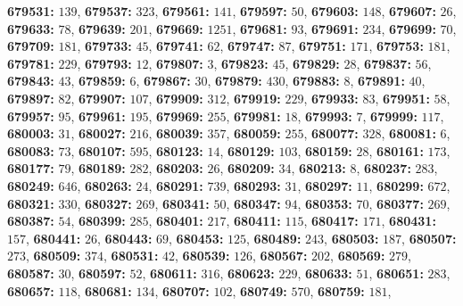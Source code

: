 \textsf{\bfseries 679531:} $139$, \textsf{\bfseries 679537:} $323$, \textsf{\bfseries 679561:} $141$, \textsf{\bfseries 679597:} $50$, \textsf{\bfseries 679603:} $148$, \textsf{\bfseries 679607:} $26$, \textsf{\bfseries 679633:} $78$, \textsf{\bfseries 679639:} $201$, \textsf{\bfseries 679669:} $1251$, \textsf{\bfseries 679681:} $93$, \textsf{\bfseries 679691:} $234$, \textsf{\bfseries 679699:} $70$, \textsf{\bfseries 679709:} $181$, \textsf{\bfseries 679733:} $45$, \textsf{\bfseries 679741:} $62$, \textsf{\bfseries 679747:} $87$, \textsf{\bfseries 679751:} $171$, \textsf{\bfseries 679753:} $181$, \textsf{\bfseries 679781:} $229$, \textsf{\bfseries 679793:} $12$, \textsf{\bfseries 679807:} $3$, \textsf{\bfseries 679823:} $45$, \textsf{\bfseries 679829:} $28$, \textsf{\bfseries 679837:} $56$, \textsf{\bfseries 679843:} $43$, \textsf{\bfseries 679859:} $6$, \textsf{\bfseries 679867:} $30$, \textsf{\bfseries 679879:} $430$, \textsf{\bfseries 679883:} $8$, \textsf{\bfseries 679891:} $40$, \textsf{\bfseries 679897:} $82$, \textsf{\bfseries 679907:} $107$, \textsf{\bfseries 679909:} $312$, \textsf{\bfseries 679919:} $229$, \textsf{\bfseries 679933:} $83$, \textsf{\bfseries 679951:} $58$, \textsf{\bfseries 679957:} $95$, \textsf{\bfseries 679961:} $195$, \textsf{\bfseries 679969:} $255$, \textsf{\bfseries 679981:} $18$, \textsf{\bfseries 679993:} $7$, \textsf{\bfseries 679999:} $117$, \textsf{\bfseries 680003:} $31$, \textsf{\bfseries 680027:} $216$, \textsf{\bfseries 680039:} $357$, \textsf{\bfseries 680059:} $255$, \textsf{\bfseries 680077:} $328$, \textsf{\bfseries 680081:} $6$, \textsf{\bfseries 680083:} $73$, \textsf{\bfseries 680107:} $595$, \textsf{\bfseries 680123:} $14$, \textsf{\bfseries 680129:} $103$, \textsf{\bfseries 680159:} $28$, \textsf{\bfseries 680161:} $173$, \textsf{\bfseries 680177:} $79$, \textsf{\bfseries 680189:} $282$, \textsf{\bfseries 680203:} $26$, \textsf{\bfseries 680209:} $34$, \textsf{\bfseries 680213:} $8$, \textsf{\bfseries 680237:} $283$, \textsf{\bfseries 680249:} $646$, \textsf{\bfseries 680263:} $24$, \textsf{\bfseries 680291:} $739$, \textsf{\bfseries 680293:} $31$, \textsf{\bfseries 680297:} $11$, \textsf{\bfseries 680299:} $672$, \textsf{\bfseries 680321:} $330$, \textsf{\bfseries 680327:} $269$, \textsf{\bfseries 680341:} $50$, \textsf{\bfseries 680347:} $94$, \textsf{\bfseries 680353:} $70$, \textsf{\bfseries 680377:} $269$, \textsf{\bfseries 680387:} $54$, \textsf{\bfseries 680399:} $285$, \textsf{\bfseries 680401:} $217$, \textsf{\bfseries 680411:} $115$, \textsf{\bfseries 680417:} $171$, \textsf{\bfseries 680431:} $157$, \textsf{\bfseries 680441:} $26$, \textsf{\bfseries 680443:} $69$, \textsf{\bfseries 680453:} $125$, \textsf{\bfseries 680489:} $243$, \textsf{\bfseries 680503:} $187$, \textsf{\bfseries 680507:} $273$, \textsf{\bfseries 680509:} $374$, \textsf{\bfseries 680531:} $42$, \textsf{\bfseries 680539:} $126$, \textsf{\bfseries 680567:} $202$, \textsf{\bfseries 680569:} $279$, \textsf{\bfseries 680587:} $30$, \textsf{\bfseries 680597:} $52$, \textsf{\bfseries 680611:} $316$, \textsf{\bfseries 680623:} $229$, \textsf{\bfseries 680633:} $51$, \textsf{\bfseries 680651:} $283$, \textsf{\bfseries 680657:} $118$, \textsf{\bfseries 680681:} $134$, \textsf{\bfseries 680707:} $102$, \textsf{\bfseries 680749:} $570$, \textsf{\bfseries 680759:} $181$, 
